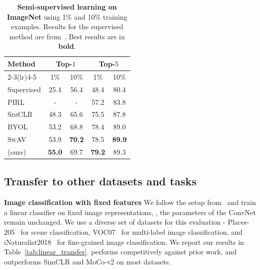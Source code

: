 \begin{table}[ht]
\caption{\textbf{Semi-supervised learning on ImageNet} using 1\% and 10\% training examples. Results for the supervised method are from~\cite{zhai2019s4l}. Best results are in \textbf{bold}.}
\label{tab:abl-semisupervised}
\vskip 0.15in
\begin{center}
\begin{tabular}{lcccc}
\toprule
Method     & \multicolumn{2}{c}{Top-$1$} & \multicolumn{2}{c}{Top-$5$} \\
\cmidrule(lr){2-3}\cmidrule(lr){4-5}
          &  1\% & 10\%            & 1\% & 10\% \\
\midrule
Supervised         & 25.4 & 56.4 & 48.4 & 80.4 \\
\midrule
\textsc{PIRL}               & - & -           & 57.2 & 83.8\\
\textsc{SimCLR}    & 48.3 & 65.6 & 75.5 & 87.8\\
\textsc{BYOL}      & 53.2 & 68.8 & 78.4 & 89.0\\
\textsc{SwAV}               & 53.9 & \bf{70.2} & 78.5 & \bf{89.9}\\
\AlgoName{} (ours) & \bf{55.0} & 69.7 & \bf{79.2} & 89.3\\
\bottomrule
\end{tabular}
\end{center}
\vskip -0.1in
\end{table}

\subsection{Transfer to other datasets and tasks}





\par \noindent \textbf{Image classification with fixed features} We follow the setup from~\cite{misra2019self} and train a linear classifier on fixed image representations, \ie, the parameters of the ConvNet remain unchanged. We use a diverse set of datasets for this evaluation - Places-205~\cite{zhou2014learning} for scene classification, VOC07~\cite{everingham2010pascal} for multi-label image classification, and iNaturalist2018~\cite{van2018inaturalist} for fine-grained image classification. We report our results in Table~\ref{tab:linear_transfer}. \AlgoName{} performs competitively against prior work, and outperforms SimCLR and MoCo-v2 on most datasets.


